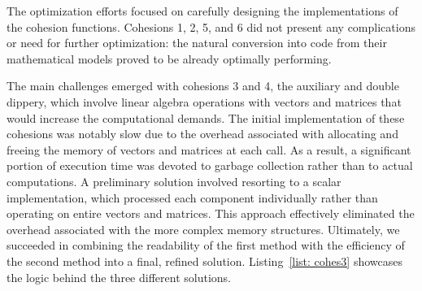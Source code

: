 \documentclass[12pt,	%
	a4paper,		%
	twoside,		%
	openright,		%
	titlepage,%
	]{book}
\theoremstyle{definition}
\begin{document}
The optimization efforts focused on carefully designing the implementations of the cohesion functions. Cohesions 1, 2, 5, and 6 did not present any complications or need for further optimization: the natural conversion into code from their mathematical models proved to be already optimally performing. 

The main challenges emerged with cohesions 3 and 4, the auxiliary and double dippery, which involve linear algebra operations with vectors and matrices that would increase the computational demands.
The initial implementation of these cohesions was notably slow due to the overhead associated with allocating and freeing the memory of vectors and matrices at each call. As a result, a significant portion of execution time was devoted to garbage collection rather than to actual computations. A preliminary solution involved resorting to a scalar implementation, which processed each component individually rather than operating on entire vectors and matrices. This approach effectively eliminated the overhead associated with the more complex memory structures. Ultimately, we succeeded in combining the readability of the first method with the efficiency of the second method into a final, refined solution. Listing~\ref{list: cohes3} showcases the logic behind the three different solutions.
\end{document}
